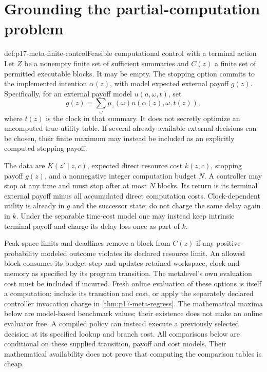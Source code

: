 \section{Grounding the partial-computation problem}
\label{sec:p17-meta-partial}

\begin{hbdefinition}{def:p17-meta-finite-control}{Feasible computational control with a terminal action}
Let \(Z\) be a nonempty finite set of sufficient summaries and
\(C(z)\) a finite set of permitted executable blocks. It may be empty.
The stopping option commits to the implemented intention \(\alpha(z)\),
with model expected external payoff \(g(z)\). Specifically, for
an external payoff model \(u(a,\omega,t)\), set
\[
             g(z)=\sum_\omega\mu_z(\omega)
                        u(\alpha(z),\omega,t(z)),
\]
where \(t(z)\) is the clock in that summary.
It does not secretly
optimize an uncomputed true-utility table. If several already available
external decisions can be chosen, their finite maximum may instead be
included as an explicitly computed stopping payoff.

The data are \(K(z'\mid z,c)\), expected direct resource cost
\(k(z,c)\), stopping payoff \(g(z)\), and a nonnegative integer
computation budget \(N\). A controller may stop at any time and must
stop after at most \(N\) blocks. Its return is its terminal external
payoff minus all accumulated direct computation costs. Clock-dependent
utility is already in \(g\) and the successor state; do not charge
the same delay again in \(k\). Under the separable time-cost model
one may instead keep intrinsic terminal payoff and charge its delay
loss once as part of \(k\).

Peak-space limits and deadlines remove a block from \(C(z)\) if
any positive-probability modeled outcome violates its declared resource
limit. An allowed block consumes its budget step and updates retained
workspace, clock and memory as specified by its program transition.
The metalevel's own evaluation cost must be included if incurred.
Fresh online evaluation of these options is itself a computation:
include its transition and cost, or apply the separately declared
controller invocation charge in \cref{thm:p17-meta-regress}.
The mathematical maxima below are model-based benchmark values;
their existence does not make an online evaluator free. A compiled
policy can instead execute a previously selected decision at its
specified lookup and branch cost.
All comparisons below are conditional on these supplied transition,
payoff and cost models. Their mathematical availability does not prove
that computing the comparison tables is cheap.
\end{hbdefinition}

